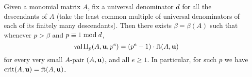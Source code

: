 \documentclass{amsart}
\begin{document}
%
%
%
%
%
%

\begin{proposition}
   Given a monomial matrix $A$, fix a universal denominator $d$ for all the descendants of $A$ \textup(\eg take the least common multiple of universal denominators of each of its finitely many descendants\textup).
   Then there exists $\beta = \beta(A)$ such that whenever $p>\beta$ and $p \equiv 1 \bmod d$,
\[
 \operatorname{val}\Pi_p(A,\mathbf{u},p^e) = (p^e-1) \cdot \operatorname{ft}(A, \mathbf{u})
\]
for every very small $A$-pair $(A, \mathbf{u})$, and all $e \geq 1$.
In particular, for such $p$ we have $\operatorname{crit}(A,\mathbf{u}) = \operatorname{ft}(A, \mathbf{u})$.
\end{proposition}
\end{document}
